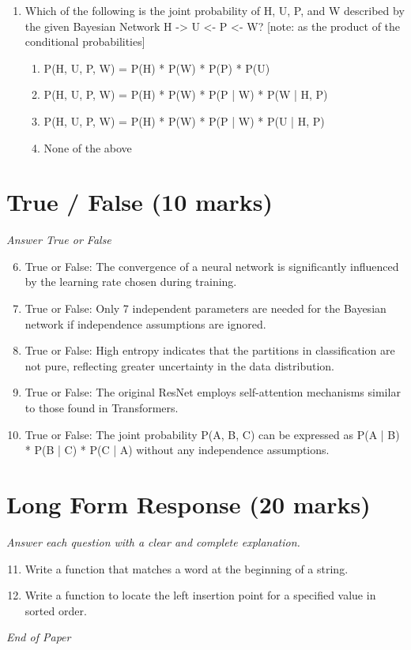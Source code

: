 \documentclass[12pt]{article}
\begin{document}
\begin{enumerate}[label=\arabic*.]
\begin{enumerate}[label=(\alph*)]
    \item False, False
    \item True, False
    \item False, True
\end{enumerate}
\item Which of the following is the joint probability of H, U, P, and W described by the given Bayesian Network H -\textgreater{} U \textless{}- P \textless{}- W? [note: as the product of the conditional probabilities]
\begin{enumerate}[label=(\alph*)]
    \item P(H, U, P, W) = P(H) * P(W) * P(P) * P(U)
    \item P(H, U, P, W) = P(H) * P(W) * P(P | W) * P(W | H, P)
    \item P(H, U, P, W) = P(H) * P(W) * P(P | W) * P(U | H, P)
    \item None of the above
\end{enumerate}
\end{enumerate}

\section*{True / False (10 marks)}
\textit{Answer True or False}
\begin{enumerate}[label=\arabic*.]
\setcounter{enumi}{5}
\item True or False: The convergence of a neural network is significantly influenced by the learning rate chosen during training.
\item True or False: Only 7 independent parameters are needed for the Bayesian network if independence assumptions are ignored.
\item True or False: High entropy indicates that the partitions in classification are not pure, reflecting greater uncertainty in the data distribution.
\item True or False: The original ResNet employs self-attention mechanisms similar to those found in Transformers.
\item True or False: The joint probability P(A, B, C) can be expressed as P(A | B) * P(B | C) * P(C | A) without any independence assumptions.
\end{enumerate}

\section*{Long Form Response (20 marks)}
\textit{Answer each question with a clear and complete explanation.}
\begin{enumerate}[label=\arabic*.]
\setcounter{enumi}{10}
\item Write a function that matches a word at the beginning of a string.
\item Write a function to locate the left insertion point for a specified value in sorted order.
\end{enumerate}

\vfill
\noindent\textit{End of Paper}
\end{document}
